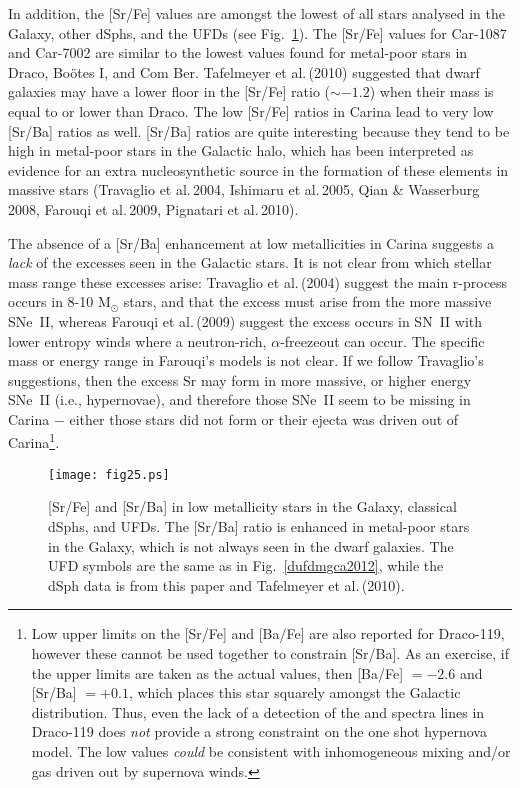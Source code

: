 \documentclass{emulateapj}
\newcommand\etal{{\rm et al.\,}}
\begin{document}
In addition, the [Sr/Fe] values are amongst the lowest of all stars 
analysed in the Galaxy, other dSphs, and the UFDs (see Fig.~\ref{dufdsrba}).
The [Sr/Fe] values for Car-1087 and Car-7002 are similar to the lowest
values found for metal-poor stars in Draco, Bo\"otes I, and Com Ber.
Tafelmeyer \etal (2010) suggested that dwarf galaxies may have a lower floor
in the [Sr/Fe] ratio ($\sim -1.2$) when their mass is equal to or lower than Draco.
The low [Sr/Fe] ratios in Carina lead to very low [Sr/Ba] ratios as well.
[Sr/Ba] ratios are quite interesting because they tend to be high in metal-poor 
stars in the Galactic halo, which has been interpreted as evidence for an extra 
nucleosynthetic source in the formation of these elements in massive stars
(Travaglio \etal  2004, Ishimaru \etal  2005, 
Qian \& Wasserburg 2008, Farouqi \etal 2009, Pignatari \etal  2010).

The absence of a [Sr/Ba] enhancement at low metallicities in Carina 
suggests a {\it lack} of the excesses seen in the Galactic stars.
It is not clear from which stellar mass range these excesses arise:
Travaglio \etal (2004) suggest the main r-process occurs in 8-10 M$_\odot$
stars, and that the excess must arise from the more massive SNe~II,
whereas Farouqi \etal (2009) suggest the excess occurs in SN~II with
lower entropy winds where a neutron-rich, $\alpha$-freezeout can occur.
The specific mass or energy range in Farouqi's models is not clear.
If we follow Travaglio's suggestions, then the excess Sr may form in
more massive, or higher energy SNe~II (i.e., hypernovae),
and therefore those SNe~II seem to be missing in Carina $-$ 
either those stars did not form or their ejecta was driven out of 
%
Carina\footnote{Low upper limits on the [Sr/Fe] and 
[Ba/Fe] are also reported for Draco-119, however these cannot be used together
to constrain [Sr/Ba].  As an exercise, if the upper limits are taken as the
actual values, then [Ba/Fe] $=-2.6$ and [Sr/Ba] $=+0.1$, which places this
star squarely amongst the Galactic distribution.  Thus, even the lack of a
detection of the  and  spectra lines in Draco-119 does 
{\it not} provide a strong constraint on the one shot hypernova model.   The
low values {\it could} be consistent with inhomogeneous mixing and/or gas
driven out by supernova winds.}.   


\begin{figure}[t]
\texttt{[image: fig25.ps]}
\caption{[Sr/Fe] and [Sr/Ba] in low metallicity stars in the Galaxy,
classical dSphs, and UFDs.  The [Sr/Ba] ratio is enhanced in metal-poor 
stars in the Galaxy, which is not always seen in the dwarf galaxies. 
%
The UFD symbols are the same as in Fig.~\ref{dufdmgca2012}, while
the dSph data is from this paper and Tafelmeyer \etal (2010).
}
\label{dufdsrba}
\end{figure}
\end{document}
